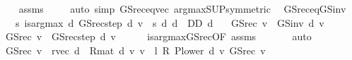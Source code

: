 \begin{isabellebody}
%
\isadelimproof
\ \ %
\endisadelimproof
%
\isatagproof
{}\isamarkupfalse%
\ assms\ \isanewline
\ \ \isamarkupfalse%
\ {\isacharparenleft}{\kern0pt}auto\ simp{\isacharcolon}{\kern0pt}\ GS{\isacharunderscore}{\kern0pt}rec{\isacharunderscore}{\kern0pt}eq{\isacharunderscore}{\kern0pt}vec\ arg{\isacharunderscore}{\kern0pt}max{\isacharunderscore}{\kern0pt}SUP{\isacharbrackleft}{\kern0pt}symmetric{\isacharbrackright}{\kern0pt}{\isacharparenright}{\kern0pt}%
\endisatagproof
{\isafoldproof}%
%
\isadelimproof
\isanewline
%
\endisadelimproof
\isanewline
{}\isamarkupfalse%
\isanewline
\ \ GS{\isacharunderscore}{\kern0pt}rec{\isacharunderscore}{\kern0pt}eq{\isacharunderscore}{\kern0pt}GS{\isacharunderscore}{\kern0pt}inv{\isacharcolon}{\kern0pt}\ \isanewline
\ \ \ {\isachardoublequoteopen}{\isasymAnd}s{\isachardot}{\kern0pt}\ is{\isacharunderscore}{\kern0pt}arg{\isacharunderscore}{\kern0pt}max\ {\isacharparenleft}{\kern0pt}{\isasymlambda}d{\isachardot}{\kern0pt}\ GS{\isacharunderscore}{\kern0pt}rec{\isacharunderscore}{\kern0pt}step\ d\ v\ {\isachardollar}{\kern0pt}\ s{\isacharparenright}{\kern0pt}\ {\isacharparenleft}{\kern0pt}{\isasymlambda}d{\isachardot}{\kern0pt}\ d\ {\isasymin}\ D\isactrlsub D{\isacharparenright}{\kern0pt}\ d{\isachardoublequoteclose}\isanewline
\ \ \ {\isachardoublequoteopen}GS{\isacharunderscore}{\kern0pt}rec\ v\ {\isacharequal}{\kern0pt}\ GS{\isacharunderscore}{\kern0pt}inv\ d\ v{\isachardoublequoteclose}\isanewline
%
\isadelimproof
%
\endisadelimproof
%
\isatagproof
{}\isamarkupfalse%
\ {\isacharminus}{\kern0pt}\isanewline
\ \ \isamarkupfalse%
\ {\isachardoublequoteopen}GS{\isacharunderscore}{\kern0pt}rec\ v\ {\isacharequal}{\kern0pt}\ GS{\isacharunderscore}{\kern0pt}rec{\isacharunderscore}{\kern0pt}step\ d\ v{\isachardoublequoteclose}\isanewline
\ \ \ \ \isamarkupfalse%
\ is{\isacharunderscore}{\kern0pt}arg{\isacharunderscore}{\kern0pt}max{\isacharunderscore}{\kern0pt}GS{\isacharunderscore}{\kern0pt}rec{\isacharbrackleft}{\kern0pt}OF\ assms{\isacharbrackright}{\kern0pt}\ \isanewline
\ \ \ \ \isamarkupfalse%
\ auto\isanewline
\ \ \isamarkupfalse%
\ {\isachardoublequoteopen}GS{\isacharunderscore}{\kern0pt}rec\ v\ {\isacharequal}{\kern0pt}\ r{\isacharunderscore}{\kern0pt}vec\ d\ {\isacharplus}{\kern0pt}\ R{\isacharunderscore}{\kern0pt}mat\ d\ {\isacharasterisk}{\kern0pt}v\ v\ {\isacharplus}{\kern0pt}\ {\isacharparenleft}{\kern0pt}l\ {\isacharasterisk}{\kern0pt}\isactrlsub R\ P{\isacharunderscore}{\kern0pt}lower\ d{\isacharparenright}{\kern0pt}\ {\isacharasterisk}{\kern0pt}v\ GS{\isacharunderscore}{\kern0pt}rec\ v{\isachardoublequoteclose}\isanewline

\end{isabellebody}
